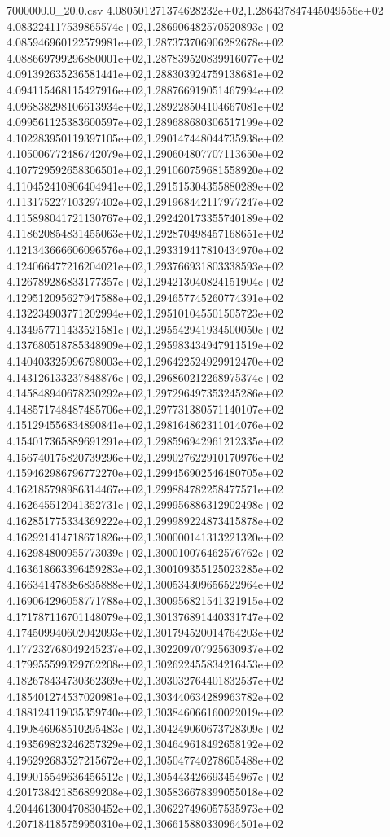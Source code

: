 \begin{filecontents*}{7000000.0_20.0.csv}
4.080501271374628232e+02,1.286437847445049556e+02
4.083224117539865574e+02,1.286906482570520893e+02
4.085946960122579981e+02,1.287373706906282678e+02
4.088669799296880001e+02,1.287839520839916077e+02
4.091392635236581441e+02,1.288303924759138681e+02
4.094115468115427916e+02,1.288766919051467994e+02
4.096838298106613934e+02,1.289228504104667081e+02
4.099561125383600597e+02,1.289688680306517199e+02
4.102283950119397105e+02,1.290147448044735938e+02
4.105006772486742079e+02,1.290604807707113650e+02
4.107729592658306501e+02,1.291060759681558920e+02
4.110452410806404941e+02,1.291515304355880289e+02
4.113175227103297402e+02,1.291968442117977247e+02
4.115898041721130767e+02,1.292420173355740189e+02
4.118620854831455063e+02,1.292870498457168651e+02
4.121343666606096576e+02,1.293319417810434970e+02
4.124066477216204021e+02,1.293766931803338593e+02
4.126789286833177357e+02,1.294213040824151904e+02
4.129512095627947588e+02,1.294657745260774391e+02
4.132234903771202994e+02,1.295101045501505723e+02
4.134957711433521581e+02,1.295542941934500050e+02
4.137680518785348909e+02,1.295983434947911519e+02
4.140403325996798003e+02,1.296422524929912470e+02
4.143126133237848876e+02,1.296860212268975374e+02
4.145848940678230292e+02,1.297296497353245286e+02
4.148571748487485706e+02,1.297731380571140107e+02
4.151294556834890841e+02,1.298164862311014076e+02
4.154017365889691291e+02,1.298596942961212335e+02
4.156740175820739296e+02,1.299027622910170976e+02
4.159462986796772270e+02,1.299456902546480705e+02
4.162185798986314467e+02,1.299884782258477571e+02
4.162645512041352731e+02,1.299956886312902498e+02
4.162851775334369222e+02,1.299989224873415878e+02
4.162921414718671826e+02,1.300000141313221320e+02
4.162984800955773039e+02,1.300010076462576762e+02
4.163618663396459283e+02,1.300109355125023285e+02
4.166341478386835888e+02,1.300534309656522964e+02
4.169064296058771788e+02,1.300956821541321915e+02
4.171787116701148079e+02,1.301376891440331747e+02
4.174509940602042093e+02,1.301794520014764203e+02
4.177232768049245237e+02,1.302209707925630937e+02
4.179955599329762208e+02,1.302622455834216453e+02
4.182678434730362369e+02,1.303032764401832537e+02
4.185401274537020981e+02,1.303440634289963782e+02
4.188124119035359740e+02,1.303846066160022019e+02
4.190846968510295483e+02,1.304249060673728309e+02
4.193569823246257329e+02,1.304649618492658192e+02
4.196292683527215672e+02,1.305047740278605488e+02
4.199015549636456512e+02,1.305443426693454967e+02
4.201738421856899208e+02,1.305836678399055018e+02
4.204461300470830452e+02,1.306227496057535973e+02
4.207184185759950310e+02,1.306615880330964501e+02

\end{filecontents*}

